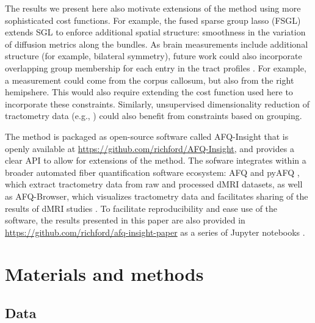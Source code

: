 \documentclass[10pt,letterpaper]{article}
\begin{document}
The results we present here also motivate extensions of the method using more
sophisticated cost functions. For example, the fused sparse group lasso
(FSGL) \cite{zhou2012} extends SGL to enforce additional spatial structure:
smoothness in the variation of diffusion metrics along the bundles. As brain
measurements include additional structure (for example, bilateral symmetry),
future work could also incorporate overlapping group membership for each
entry in the tract profiles \cite{Rao2014-xm}. For example, a measurement
could come from the corpus callosum, but also from the right hemipshere. This
would also require extending the cost function used here to incorporate these
constraints. Similarly, unsupervised dimensionality reduction of tractometry
data (e.g., \cite{Chamberland2019-mu}) could also benefit from constraints
based on grouping.

The method is packaged as open-source software called AFQ-Insight that is
openly available at \url{https://github.com/richford/AFQ-Insight}, and
provides a clear API to allow for extensions of the method. The sofware
integrates within a broader automated fiber quantification software
ecosystem: AFQ \cite{yeatman2012tract} and pyAFQ \cite{pyAFQ}, which extract
tractometry data from raw and processed dMRI datasets, as well as
AFQ-Browser, which visualizes tractometry data and facilitates sharing of the
results of dMRI studies \cite{yeatman2018browser}. To facilitate
reproducibility and ease use of the software, the results presented in this
paper are also provided in
\url{https://github.com/richford/afq-insight-paper} as a series of Jupyter
notebooks \cite{kluyver2016jupyter}.

\section*{Materials and methods}
\label{sec:methods}

\subsection*{Data}
\label{sec:data}
\end{document}
